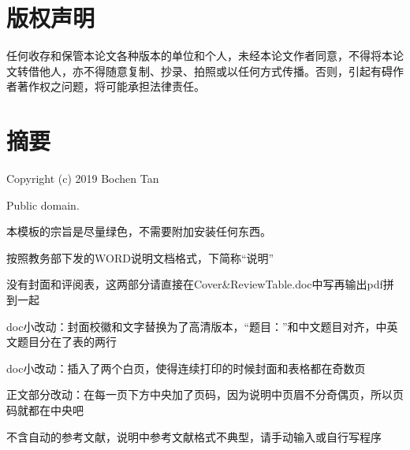 \documentclass[UTF8,openany,AutoFakeBold,AutoFakeSlant,cs4size]{ctexbook}
\title{}
\author{}
\date{}
\begin{document}
\newcommand{\chineseTitle}{中文题目（Kaiti，二号，加粗） \hfill} 
\newcommand{\englishTitle}{英文题目（Times New Roman，三号，加粗） \hfill}
\newcommand{\name}{张三}
\newcommand{\studentID}{15000xxxxx}
\newcommand{\school}{信息科学技术学院}
\newcommand{\major}{电子信息科学与技术}
\newcommand{\advisor}{李四}

\clearpage



\clearpage

\songti\linespread{1.5}\selectfont
\linespread{1.5}\selectfont

\chapter*{版权声明}
\setcounter{page}{0}
\thispagestyle{empty}
任何收存和保管本论文各种版本的单位和个人，未经本论文作者同意，不得将本论文转借他人，亦不得随意复制、抄录、拍照或以任何方式传播。否则，引起有碍作者著作权之问题，将可能承担法律责任。
\clearpage

\quad
\setcounter{page}{0}
\thispagestyle{empty}
\clearpage



\pagestyle{fancy}
\normalsize
\linespread{1.5}\selectfont
\chapter*{摘要}
Copyright (c) 2019 Bochen Tan

Public domain.

本模板的宗旨是尽量绿色，不需要附加安装任何东西。

按照教务部下发的WORD说明文档格式，下简称“说明”

没有封面和评阅表，这两部分请直接在Cover\&ReviewTable.doc中写再输出pdf拼到一起

doc小改动：封面校徽和文字替换为了高清版本，“题目：”和中文题目对齐，中英文题目分在了表的两行

doc小改动：插入了两个白页，使得连续打印的时候封面和表格都在奇数页

正文部分改动：在每一页下方中央加了页码，因为说明中页眉不分奇偶页，所以页码就都在中央吧

不含自动的参考文献，说明中参考文献格式不典型，请手动输入或自行写程序
\end{document}
